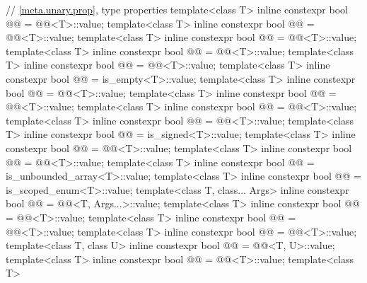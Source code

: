 \begin{codeblock}
{  // \ref{meta.unary.prop}, type properties
  template<class T>
    inline constexpr bool @@ = @@<T>::value;
  template<class T>
    inline constexpr bool @@ = @@<T>::value;
  template<class T>
    inline constexpr bool @@ = @@<T>::value;
  template<class T>
    inline constexpr bool @@ = @@<T>::value;
  template<class T>
    inline constexpr bool @@ = @@<T>::value;
  template<class T>
    inline constexpr bool @@ = is_empty<T>::value;
  template<class T>
    inline constexpr bool @@ = @@<T>::value;
  template<class T>
    inline constexpr bool @@ = @@<T>::value;
  template<class T>
    inline constexpr bool @@ = @@<T>::value;
  template<class T>
    inline constexpr bool @@ = @@<T>::value;
  template<class T>
    inline constexpr bool @@ = is_signed<T>::value;
  template<class T>
    inline constexpr bool @@ = @@<T>::value;
  template<class T>
    inline constexpr bool @@ = @@<T>::value;
  template<class T>
    inline constexpr bool @@ = is_unbounded_array<T>::value;
  template<class T>
    inline constexpr bool @@ = is_scoped_enum<T>::value;
  template<class T, class... Args>
    inline constexpr bool @@ = @@<T, Args...>::value;
  template<class T>
    inline constexpr bool @@ = @@<T>::value;
  template<class T>
    inline constexpr bool @@ = @@<T>::value;
  template<class T>
    inline constexpr bool @@ = @@<T>::value;
  template<class T, class U>
    inline constexpr bool @@ = @@<T, U>::value;
  template<class T>
    inline constexpr bool @@ = @@<T>::value;
  template<class T>
}
\end{codeblock}
